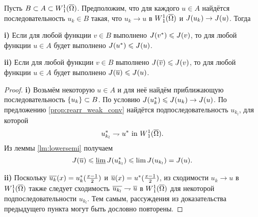 \begin{thm}
\label{thm:uplift}
Пусть $B \subset A \subset \W(\overline{\Omega})$.
Предположим, что для каждого $u \in A$ найдётся последовательность $u_k \in B$ такая,
что $u_k \to u$ в $\W(\overline{\Omega})$ и $J( u_k ) \to J( u )$.
Тогда

\textbf{\textup{i)}}
Если для любой функции $v \in B$ выполнено $J( {v^*} ) \leqslant J( v )$,
то для любой функции $u \in A$ будет выполнено $J( {u^*} ) \leqslant J( u )$.

\textbf{\textup{ii)}}
Если для любой функции $v \in B$ выполнено $\IWg( \mon{v} ) \le \IWg( v )$,
то для любой функции $u \in A$ будет выполнено $\IWg( \mon{u} ) \le \IWg( u )$.
\end{thm}

\begin{proof}
\textbf{\textup{i)}}
Возьмём некоторую $u \in A$ и для неё найдём приближающую последовательность $\{u_k\} \subset B$.
По условию $J({u_k^*}) \leqslant J(u_k) \to J(u)$.
По предложению \ref{prop:rearr_weak_conv} найдётся подпоследовательность $u_{k_l}$, для которой
$$
\symm{u_{k_l}} \rightharpoondown \symm{u} \text{ in } \W(\overline{\Omega}).
$$
Из леммы \ref{lm:lowersemi} получаем
$$
\IWg(\mon{u}) \le \varliminf \IWg(\symm{u_{k_l}}) \le \lim \IWg(u_{k_l}) = \IWg(u).
$$

\textbf{\textup{ii)}}
Поскольку $\mon{u_k}( x ) = \symm{u_k}( \frac{x - 1}{2} )$ и $\mon{u}( x ) = \symm{u}( \frac{x - 1}{2} )$,
из сходимости $u_k \to u$ в $\W(\overline{\Omega})$ также следует сходимость $\mon{u_{k_l}} \rightharpoondown \mon{u}$ в $\W(\overline{\Omega})$
для некоторой подпоследовательности $u_{k_l}$.
Тем самым, рассуждения из доказательства предыдущего пункта могут быть дословно повторены.
\end{proof}
